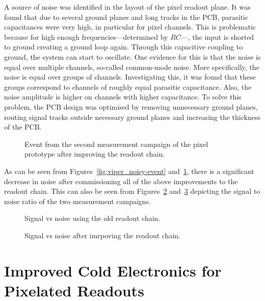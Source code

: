 A source of noise was identified in the layout of the pixel readout plane.
It was found that due to several ground planes and long tracks in the PCB, parasitic capacitances were very high, in particular for pixel channels.
This is problematic because for high enough frequencies---determined by $RC$---, the input is shorted to ground creating a ground loop again.
Through this capacitive coupling to ground, the system can start to oscillate.
One evidence for this is that the noise is equal over multiple channels, so-called common-mode noise.
More specifically, the noise is equal over groups of channels.
Investigating this, it was found that these groups correspond to channels of roughly equal parasitic capacitance.
Also, the noise amplitude is higher on channels with higher capacitance.
To solve this problem, the PCB design was optimised by removing unnecessary ground planes, routing signal tracks outside necessary ground planes and increasing the thickness of the PCB.

\begin{figure}[htb]
	\centering
	\caption{Event from the second measurement campaign of the pixel prototype after improving the readout chain.}
	\label{fig:viper_good-event}
\end{figure}

As can be seen from Figures~\ref{fig:viper_noisy-event} and~\ref{fig:viper_good-event}, there is a significant decrease in noise after commissioning all of the above improvements to the readout chain.
This can also be seen from Figures~\ref{fig:viper_snr-noisy} and~\ref{fig:viper_snr-good} depicting the signal to noise ratio of the two measurement campaigns.

\begin{figure}[htb]
	\centering
	\caption{Signal vs noise using the old readout chain.}
	\label{fig:viper_snr-noisy}
\end{figure}

\begin{figure}[htb]
	\centering
	\caption{Signal vs noise after imrpoving the readout chain.}
	\label{fig:viper_snr-good}
\end{figure}


\section{Improved Cold Electronics for Pixelated Readouts}
\label{sec:electronics_pixels}

